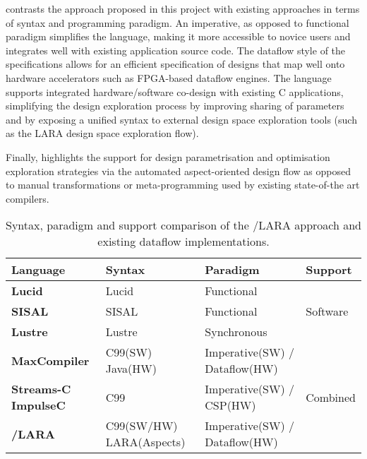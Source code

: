  contrasts the \FAST{} approach
proposed in this project with existing approaches in terms of syntax
and programming paradigm. An imperative, as opposed to functional
paradigm simplifies the language, making it more accessible to novice
users and integrates well with existing application source code. The
dataflow style of the \FAST{} specifications allows for an efficient
specification of designs that map well onto hardware accelerators such
as FPGA-based dataflow engines. The language supports integrated
hardware/software co-design with existing C applications, simplifying
the design exploration process by improving sharing of parameters and
by exposing a unified syntax to external design space exploration
tools (such as the LARA design space exploration flow).

Finally,  highlights the support for design
parametrisation and optimisation exploration strategies via the
automated aspect-oriented design flow as opposed to manual
transformations or meta-programming used by existing state-of-the art
compilers.


\begin{table}[!ht]
  \renewcommand{\arraystretch}{1.5}
  \centering
  \begin{tabularx}{\textwidth}{X | p{2.5cm} | p{3cm} | p{1.9cm} }
    \hline
    \bf{Language}                 & \bf{Syntax}              & \bf{Paradigm}               & \bf{Support}              \\
    \hline \hline
    \bf{Lucid}                    & Lucid                    & Functional                  & \multirow{3}{*}{Software} \\
    \cline{1-3}
    \bf{SISAL}                    & SISAL                    & Functional                  &                           \\
    \cline{1-3}
    \bf{Lustre}                   & Lustre                   & Synchronous                 &                           \\
    \bf{MaxCompiler}              & C99(SW) Java(HW)         & Imperative(SW) / Dataflow(HW) & \multirow{3}{*}{Combined} \\
    \bf{Streams-C} \bf{ImpulseC}\ & C99                      & Imperative(SW) / CSP(HW)      &                           \\
    \bf{\FAST{}}/\bf{LARA}        & C99(SW/HW) LARA(Aspects) & Imperative(SW) / Dataflow(HW) &                           \\
  \end{tabularx}
  \caption{Syntax, paradigm and support comparison of the \FAST{}/LARA approach and existing dataflow implementations.}
  \label{table:feature-comparison1}
\end{table}


